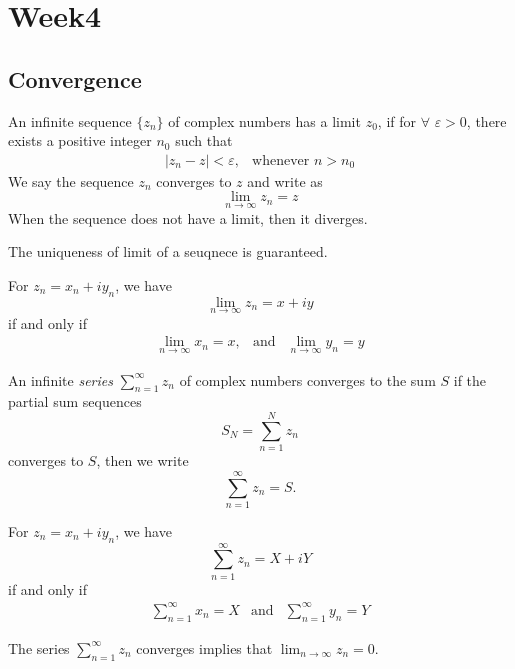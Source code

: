 
\chapter{Week4}

\section{Convergence}

\begin{definition}[Convergent]
An infinite sequence $\{z_n\}$ of complex numbers has a limit $z_0$, if for $\forall$ $\varepsilon>0$, there exists a positive integer $n_0$ such that
\[
\begin{array}{ll}
|z_n-z|<\varepsilon,
&
\mbox{whenever }n>n_0
\end{array}
\]
We say the sequence $z_n$ converges to $z$ and write as
\[
\lim_{n\to\infty}z_n=z
\]
When the sequence does not have a limit, then it diverges.
\end{definition}
The uniqueness of limit of a seuqnece is guaranteed.

\begin{proposition}
For $z_n=x_n+iy_n$, we have 
\[
\lim_{n\to\infty}z_n=x+iy
\]
if and only if
\[
\begin{array}{lll}
\lim_{n\to\infty}x_n=x,
&
\mbox{and}
&
\lim_{n\to\infty}y_n=y
\end{array}
\]
\end{proposition}

\begin{definition}
An infinite \emph{series} $\sum_{n=1}^\infty z_n$ of complex numbers converges to the sum $S$ if the partial sum sequences
\[
S_N=\sum_{n=1}^Nz_n
\]
converges to $S$, then we write
\[
\sum_{n=1}^\infty z_n=S.
\]
\end{definition}

\begin{proposition}
For $z_n=x_n+iy_n$, we have 
\[
\sum_{n=1}^\infty z_n=X+iY
\]
if and only if
\[
\begin{array}{lll}
\sum_{n=1}^\infty x_n=X
&
\mbox{and}
&
\sum_{n=1}^\infty y_n=Y
\end{array}
\]
\end{proposition}

\begin{proposition}
The series $\sum_{n=1}^\infty z_n$ converges implies that $\lim_{n\to\infty}z_n=0$.
\end{proposition}

